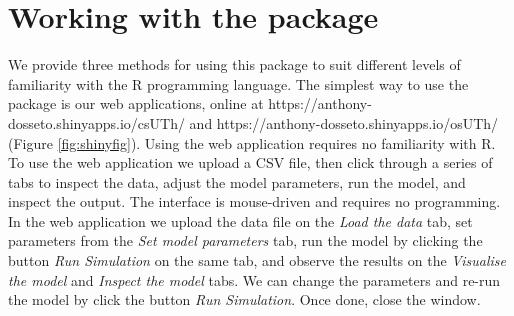 \documentclass[]{elsarticle} %
\begin{document}
\FloatBarrier

\hypertarget{working-with-the-package}{%
\section{Working with the package}\label{working-with-the-package}}

We provide three methods for using this package to suit different levels of familiarity with the R programming language. The simplest way to use the package is our web applications, online at https://anthony-dosseto.shinyapps.io/csUTh/ and https://anthony-dosseto.shinyapps.io/osUTh/ (Figure \ref{fig:shinyfig}). Using the web application requires no familiarity with R. To use the web application we upload a CSV file, then click through a series of tabs to inspect the data, adjust the model parameters, run the model, and inspect the output. The interface is mouse-driven and requires no programming. In the web application we upload the data file on the \emph{Load the data} tab, set parameters from the \emph{Set model parameters} tab, run the model by clicking the button \emph{Run Simulation} on the same tab, and observe the results on the \emph{Visualise the model} and \emph{Inspect the model} tabs. We can change the parameters and re-run the model by click the button \emph{Run Simulation}. Once done, close the window.
\end{document}
